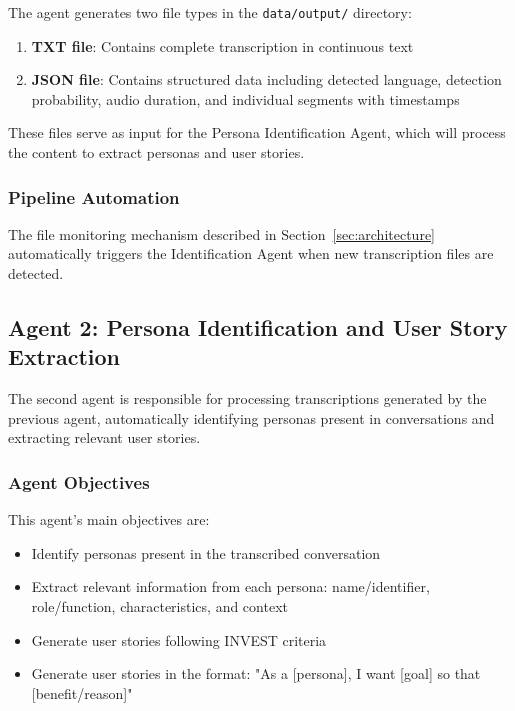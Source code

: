 \documentclass[12pt]{article}
\begin{document}
The agent generates two file types in the \texttt{data/output/} directory:

\begin{enumerate}
    \item \textbf{TXT file}: Contains complete transcription in continuous text
    \item \textbf{JSON file}: Contains structured data including detected language, detection probability, audio duration, and individual segments with timestamps
\end{enumerate}

These files serve as input for the Persona Identification Agent, which will process the content to extract personas and user stories.

\subsubsection{Pipeline Automation}

The file monitoring mechanism described in Section~\ref{sec:architecture} automatically triggers the Identification Agent when new transcription files are detected.


\subsection{Agent 2: Persona Identification and User Story Extraction}
\label{sec:agent2}

The second agent is responsible for processing transcriptions generated by the previous agent, automatically identifying personas present in conversations and extracting relevant user stories.

\subsubsection{Agent Objectives}

This agent's main objectives are:

\begin{itemize}
    \item Identify personas present in the transcribed conversation
    \item Extract relevant information from each persona: name/identifier, role/function, characteristics, and context
    \item Generate user stories following INVEST criteria
    \item Generate user stories in the format: "As a [persona], I want [goal] so that [benefit/reason]"
\end{itemize}
\end{document}

